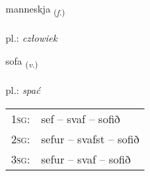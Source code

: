 \documentclass[frontgrid, backgrid]{flacards}\usepackage[]{graphicx}\usepackage[]{xcolor}
\begin{document}
\renewcommand{\flhead}{\vskip5pt \fboxsep=0pt {\small\bfseries\footnotesize Nafnorð | rzeczownik}}
\renewcommand{\fcfoot}{\vskip5pt \fboxsep=0pt \hspace{2pt}{\small\bfseries\footnotesize 1K}}

\renewcommand{\blhead}{\vskip5pt {\small\bfseries\footnotesize Nafnorð | rzeczownik }}
\renewcommand{\bcfoot}{\vskip5pt \hspace{2pt}{\small\bfseries\footnotesize 1K}}


{manneskja \small{\textsubscript{(\textit{f.})}} \\[1ex] %
\textphonetic{[manɛsca]} \\
pl.: \emph{człowiek} \\  [2ex]
\renewcommand*{\arraystretch}{0.8}
}

\renewcommand{\flhead}{\vskip5pt \fboxsep=0pt {\small\bfseries\footnotesize Sagnorð | czasownik}}
\renewcommand{\fcfoot}{\vskip5pt \fboxsep=0pt \hspace{2pt}{\small\bfseries\footnotesize 1K}}

\renewcommand{\blhead}{\vskip5pt {\small\bfseries\footnotesize Sagnorð | czasownik }}
\renewcommand{\bcfoot}{\vskip5pt \hspace{2pt}{\small\bfseries\footnotesize 1K}}


{sofa \small{\textsubscript{(\textit{v.})}} \\[1ex] %
\textphonetic{[sɔːva]} \\
pl.: \emph{spać} \\  [2ex]
\renewcommand*{\arraystretch}{0.8}
\begin{tabular}{p{1cm}l}
\textsc{1sg}: & sef -- svaf -- sofið \\ 
\textsc{2sg}: & sefur -- svafst -- sofið \\ 
\textsc{3sg}: & sefur -- svaf -- sofið \\ 
\end{tabular}
}
\end{document}
